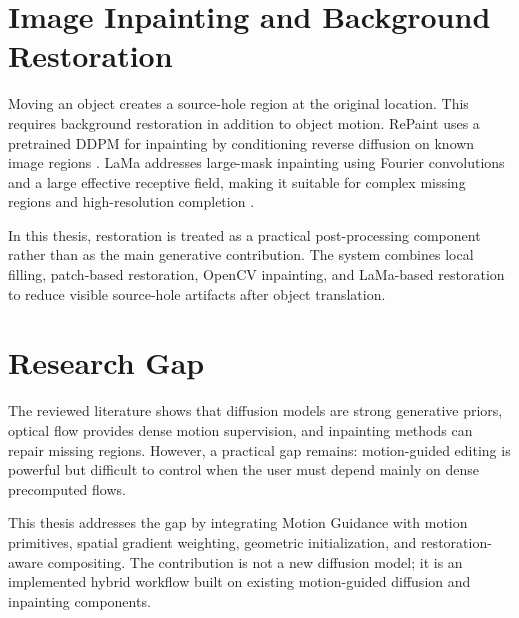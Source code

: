 \section{Image Inpainting and Background Restoration}

Moving an object creates a source-hole region at the original location. This requires background restoration in addition to object motion. RePaint uses a pretrained DDPM for inpainting by conditioning reverse diffusion on known image regions \cite{lugmayr2022repaint}. LaMa addresses large-mask inpainting using Fourier convolutions and a large effective receptive field, making it suitable for complex missing regions and high-resolution completion \cite{suvorov2022lama}.

In this thesis, restoration is treated as a practical post-processing component rather than as the main generative contribution. The system combines local filling, patch-based restoration, OpenCV inpainting, and LaMa-based restoration to reduce visible source-hole artifacts after object translation.

\section{Research Gap}

The reviewed literature shows that diffusion models are strong generative priors, optical flow provides dense motion supervision, and inpainting methods can repair missing regions. However, a practical gap remains: motion-guided editing is powerful but difficult to control when the user must depend mainly on dense precomputed flows.

This thesis addresses the gap by integrating Motion Guidance with motion primitives, spatial gradient weighting, geometric initialization, and restoration-aware compositing. The contribution is not a new diffusion model; it is an implemented hybrid workflow built on existing motion-guided diffusion and inpainting components.

